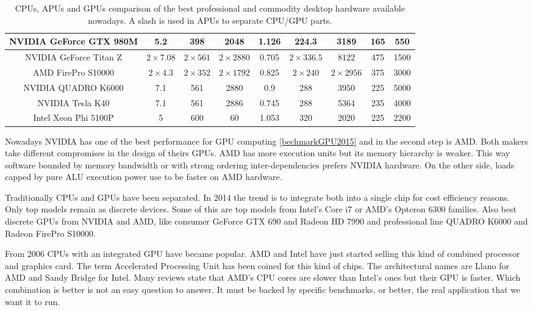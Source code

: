 \documentclass[review]{elsarticle}
\begin{document}
\begin{table}[!ht]
{\begin{tabular}{|c|c|c|c|c|c|c|c|c|}
\hline
NVIDIA GeForce GTX 980M & 5.2           & 398          & 2048          & 1.126      & 224.3        & 3189           & 165 & 550    \\
\hline
NVIDIA GeForce Titan Z  & $2\times7.08$ & $2\times561$ & $2\times2880$ & 0.705      & $2\times336.5$ & 8122         & 475 & 1500   \\
\hline
\hline
AMD FirePro S10000      & $2\times4.3$  & $2\times352$ & $2\times1792$ & 0.825      & $2\times240$ & $2\times2956$  & 375 & 3000   \\
\hline
NVIDIA QUADRO K6000     & 7.1           & 561          & 2880          & 0.9        & 288          & 3950           & 225 & 5000   \\
\hline
\hline
NVIDIA Tesla K40        & 7.1           & 561          & 2886          & 0.745      & 288          & 5364           & 235 & 4000   \\
\hline
Intel Xeon Phi 5100P    & 5             & 600          & 60            & 1.053      & 320          & 2020           & 225 & 2200   \\
\hline

\end{tabular}
}
\caption{CPUs, APUs and GPUs comparison of the best professional and commodity desktop hardware available nowadays. A slash is used in APUs to separate CPU/GPU parts. \label{tab:features}}
\end{table}

Nowadays NVIDIA has one of the best performance for GPU computing \ref{bechmarkGPU2015} and in the second step is AMD. Both makers take different compromises in the design of
theirs GPUs. AMD has more execution units but its memory hierarchy is
weaker. This way software bounded by memory bandwidth or with strong
ordering inter-dependencies prefers NVIDIA hardware. On the other
side, loads capped by pure ALU execution power use to be faster on AMD
hardware. %

Traditionally CPUs and GPUs have been separated. In 2014 the trend is
to integrate both into a single chip for cost efficiency reasons. Only
top models remain as discrete devices. Some of this are top models
from Intel's Core i7 or AMD's Opteron 6300 families. Also best
discrete GPUs from NVIDIA and AMD, like consumer GeForce GTX 690 and
Radeon HD 7990 and professional line QUADRO K6000 and Radeon FirePro
S10000. %

From 2006 CPUs with an integrated GPU have became popular. AMD and Intel have just
started selling this kind of combined processor and graphics card. The
term Accelerated Processing Unit has been coined for this kind of
chips. The architectural names are Llano for AMD and Sandy Bridge for
Intel. Many reviews state that AMD's CPU cores are slower than Intel's
ones but their GPU is faster. Which combination is better is not an
easy question to answer. It must be backed by specific benchmarks, or
better, the real application that we want it to run. %
\end{document}
